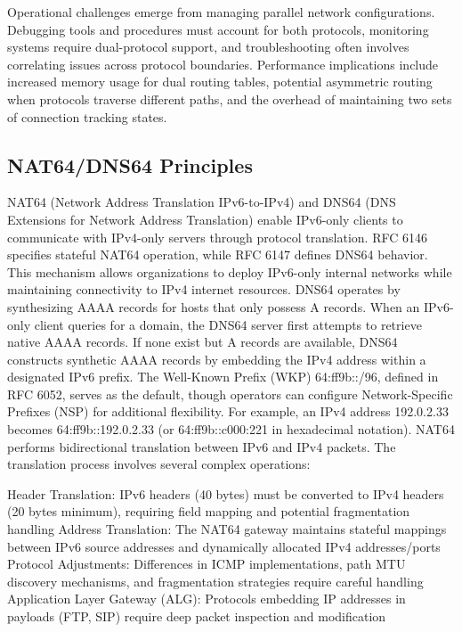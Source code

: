 Operational challenges emerge from managing parallel network configurations. Debugging tools and procedures must account for both protocols, monitoring systems require dual-protocol support, and troubleshooting often involves correlating issues across protocol boundaries. Performance implications include increased memory usage for dual routing tables, potential asymmetric routing when protocols traverse different paths, and the overhead of maintaining two sets of connection tracking states.
\subsection{NAT64/DNS64 Principles}
NAT64 (Network Address Translation IPv6-to-IPv4) and DNS64 (DNS Extensions for Network Address Translation) enable IPv6-only clients to communicate with IPv4-only servers through protocol translation. RFC 6146 specifies stateful NAT64 operation, while RFC 6147 defines DNS64 behavior. This mechanism allows organizations to deploy IPv6-only internal networks while maintaining connectivity to IPv4 internet resources.
DNS64 operates by synthesizing AAAA records for hosts that only possess A records. When an IPv6-only client queries for a domain, the DNS64 server first attempts to retrieve native AAAA records. If none exist but A records are available, DNS64 constructs synthetic AAAA records by embedding the IPv4 address within a designated IPv6 prefix. The Well-Known Prefix (WKP) 64:ff9b::/96, defined in RFC 6052, serves as the default, though operators can configure Network-Specific Prefixes (NSP) for additional flexibility. For example, an IPv4 address 192.0.2.33 becomes 64:ff9b::192.0.2.33 (or 64:ff9b::c000:221 in hexadecimal notation).
NAT64 performs bidirectional translation between IPv6 and IPv4 packets. The translation process involves several complex operations:

Header Translation: IPv6 headers (40 bytes) must be converted to IPv4 headers (20 bytes minimum), requiring field mapping and potential fragmentation handling
Address Translation: The NAT64 gateway maintains stateful mappings between IPv6 source addresses and dynamically allocated IPv4 addresses/ports
Protocol Adjustments: Differences in ICMP implementations, path MTU discovery mechanisms, and fragmentation strategies require careful handling
Application Layer Gateway (ALG): Protocols embedding IP addresses in payloads (FTP, SIP) require deep packet inspection and modification

